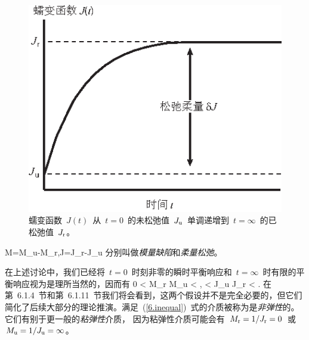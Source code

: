 \begin{figure}
\begin{center}
\includegraphics{../figures/chap06/fig02.eps}
\end{center}
\caption[creep]{
蠕变函数~$J(t)$~从~$t=0$~的未松弛值~$J_{\rm u}$~单调递增到~$t=\infty$~的已松弛值~$J_{\rm r}$。
}
\end{figure}
\eq
\delta M=M_{\rm u}-M_{\rm r},\qquad\delta J=J_{\rm r}-J_{\rm u}
\en
分别叫做{\em 模量缺陷\/}和{\em 柔量松弛\/}。
%
%
%

在上述讨论中，我们已经将~$t=0$~时刻非零的瞬时平衡响应和~$t=\infty$~时有限的平衡响应视为是理所当然的，因而有
\eq
\label{6.inequal}
0 < M_{\rm r} \leq M_{\rm u} < \infty, < J_{\rm u} \leq J_{\rm r} < \infty.
\en
在第~6.1.4~节和第~6.1.11~节我们将会看到，这两个假设并不是完全必要的，但它们简化了后续大部分的理论推演。满足~(\ref{6.inequal})~式的介质被称为是{\em 非弹性\/}的。
%
它们有别于更一般的{\em 粘弹性\/}介质，
%
因为粘弹性介质可能会有~$M_{\rm r}=1/J_{\rm r}=0$~或~$M_{\rm u}=1/J_{\rm u}=\infty$。

